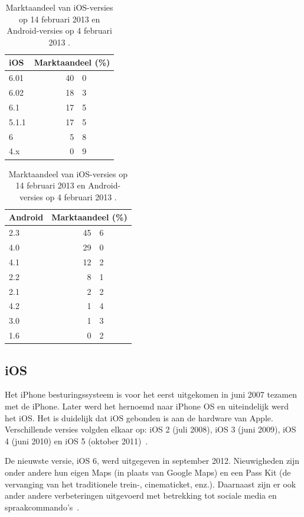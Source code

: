 \begin{table}[t]
\centering
\begin{tabular}[b]{l r@{,}l}
\toprule
\textbf{iOS}    	& \multicolumn{2}{c}{\textbf{Marktaandeel (\%)}} \\
\midrule
6.01		& 40 & 0 \\
6.02		& 18 & 3 \\
6.1		& 17 & 5	\\
5.1.1	& 17 & 5 \\
6		& 5 & 8 \\
4.x		& 0 & 9 \\
\bottomrule
\end{tabular}
\quad
\begin{tabular}[b]{l r@{,}l}
\toprule
\textbf{Android}	& \multicolumn{2}{c}{\textbf{Marktaandeel (\%)}} \\
\midrule
2.3		& 45 & 6 \\
4.0		& 29 & 0 \\
4.1		& 12 & 2 \\
2.2		& 8 & 1 \\
2.1		& 2 & 2 \\
4.2		& 1 & 4 \\
3.0		& 1 & 3 \\
1.6 		& 0 & 2 \\
\bottomrule
\end{tabular}
\caption{Marktaandeel van iOS-versies op 14 februari 2013 en Android-versies op 4 februari 2013 \protect\cite{Sylvain2013,Android2013}.}
\label{table:marktaandeel-ios-android}
\end{table}

\subsection{iOS}
Het iPhone besturingssysteem is voor het eerst uitgekomen in juni 2007 tezamen met de iPhone. 
Later werd het hernoemd naar iPhone OS en uiteindelijk werd het iOS. 
Het is duidelijk dat iOS gebonden is aan de hardware van Apple. 
Verschillende versies volgden elkaar op: iOS 2 (juli 2008), iOS 3 (juni 2009), iOS 4 (juni 2010) en iOS 5 (oktober 2011)~\cite{Deitel2012, PhilDutson2012}. 

De nieuwste versie, iOS 6, werd uitgegeven in september 2012. 
Nieuwigheden zijn onder andere hun eigen Maps (in plaats van Google Maps) en een Pass Kit (de vervanging van het traditionele trein-, cinematicket, enz.). 
Daarnaast zijn er ook ander andere verbeteringen uitgevoerd met betrekking tot sociale media en spraakcommando's~\cite{Deitel2012}.

